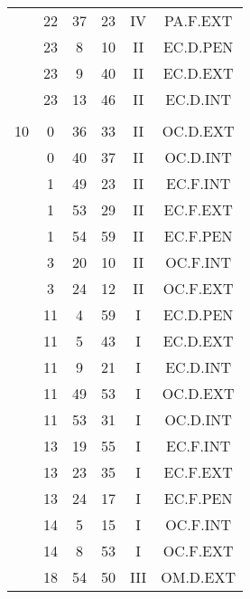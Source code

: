 \documentclass[12pt, a4paper]{article}
\begin{document}
\begin{multicols}{3}
{\begin{tabular}{c c c c c c}
	 	 	 	 & 22 & 37 & 23 & IV & PA.F.EXT\\%
	 	 	 	 & 23 & 8 & 10 & II & EC.D.PEN\\%
	 	 	 	 & 23 & 9 & 40 & II & EC.D.EXT\\%
	 	 	 	 & 23 & 13 & 46 & II & EC.D.INT\\%
	 	 	 	 & & & & & \\%
	 	 	 	10 & 0 & 36 & 33 & II & OC.D.EXT\\%
	 	 	 	 & 0 & 40 & 37 & II & OC.D.INT\\%
	 	 	 	 & 1 & 49 & 23 & II & EC.F.INT\\%
	 	 	 	 & 1 & 53 & 29 & II & EC.F.EXT\\%
	 	 	 	 & 1 & 54 & 59 & II & EC.F.PEN\\%
	 	 	 	 & 3 & 20 & 10 & II & OC.F.INT\\%
	 	 	 	 & 3 & 24 & 12 & II & OC.F.EXT\\%
	 	 	 	 & 11 & 4 & 59 & I & EC.D.PEN\\%
	 	 	 	 & 11 & 5 & 43 & I & EC.D.EXT\\%
	 	 	 	 & 11 & 9 & 21 & I & EC.D.INT\\%
	 	 	 	 & 11 & 49 & 53 & I & OC.D.EXT\\%
	 	 	 	 & 11 & 53 & 31 & I & OC.D.INT\\%
	 	 	 	 & 13 & 19 & 55 & I & EC.F.INT\\%
	 	 	 	 & 13 & 23 & 35 & I & EC.F.EXT\\%
	 	 	 	 & 13 & 24 & 17 & I & EC.F.PEN\\%
	 	 	 	 & 14 & 5 & 15 & I & OC.F.INT\\%
	 	 	 	 & 14 & 8 & 53 & I & OC.F.EXT\\%
	 	 	 	 & 18 & 54 & 50 & III & OM.D.EXT\\%

\end{tabular}}
\end{multicols}
\end{document}

